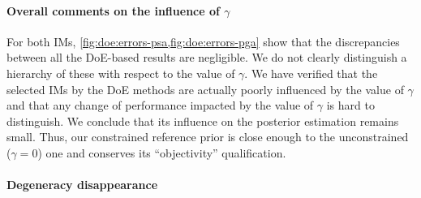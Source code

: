 
\paragraph{{Overall comments on the influence of $\gamma$}}

{For both IMs, \cref{fig:doe:errors-psa,fig:doe:errors-pga} show that the discrepancies between all the DoE-based results are negligible. We do not clearly distinguish a hierarchy of these with respect to the value of $\gamma$.}
We have verified that the selected IMs by the DoE methods are actually poorly influenced by the value of $\gamma$ and that any change of performance impacted by the value of $\gamma$ is hard to distinguish. We conclude that its influence on the posterior estimation remains small. Thus, our constrained reference prior is close enough to the unconstrained ($\gamma = 0$) one and conserves its ``objectivity'' qualification.

\paragraph{Degeneracy disappearance} 

